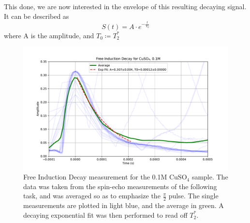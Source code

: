 \documentclass[12pt]{article}
\begin{document}
This done, we are now interested in the envelope of this resulting decaying signal. It can be described as  \[
	S(t) = A \cdot e^{-\frac{t}{T_0}}
\]
where A is the amplitude, and $T_0 \coloneq T_2^*$

\begin{figure}[H]
  \includegraphics[scale = 0.5]{Free_Induction_Decay_0.1M.pdf}
  \caption{Free Induction Decay measurement for the 0.1M $\text{CuSO}_4$ sample. The data was taken from the spin-echo measurements of the following task, and was averaged so as to emphasize the $\frac{\pi}{2}$ pulse. The single measurements are plotted in light blue, and the average in green. A decaying exponential fit was then performed to read off $T_2^*$.}
  \label{Free_Induction_Decay_0.1M.pdf}
\end{figure}

%
\end{document}
